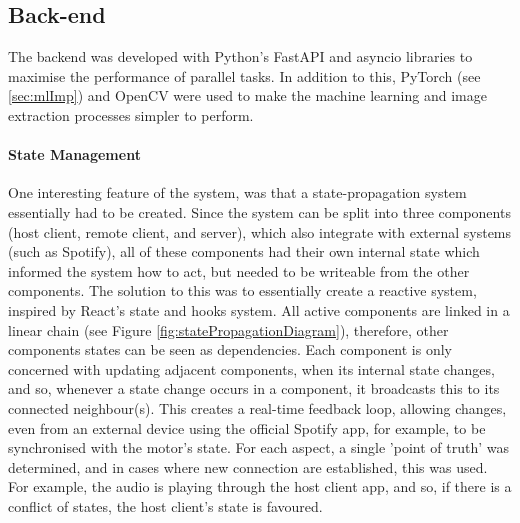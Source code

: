         \subsection{Back-end} %
    
            The backend was developed with Python's FastAPI and asyncio libraries to maximise the performance of parallel tasks. In addition to this, PyTorch (see \ref{sec:mlImp}) and OpenCV were used to make the machine learning and image extraction processes simpler to perform.
    
            \paragraph{State Management}
            One interesting feature of the system, was that a state-propagation system essentially had to be created. Since the system can be split into three components (host client, remote client, and server), which also integrate with external systems (such as Spotify), all of these components had their own internal state which informed the system how to act, but needed to be writeable from the other components. The solution to this was to essentially create a reactive system, inspired by React's state and hooks system. All active components are linked in a linear chain (see Figure \ref{fig:statePropagationDiagram}), therefore, other components states can be seen as dependencies. Each component is only concerned with updating adjacent components, when its internal state changes, and so, whenever a state change occurs in a component, it broadcasts this to its connected neighbour(s). This creates a real-time feedback loop, allowing changes, even from an external device using the official Spotify app, for example, to be synchronised with the motor's state. For each aspect, a single 'point of truth' was determined, and in cases where new connection are established, this was used. For example, the audio is playing through the host client app, and so, if there is a conflict of states, the host client's state is favoured.
            
